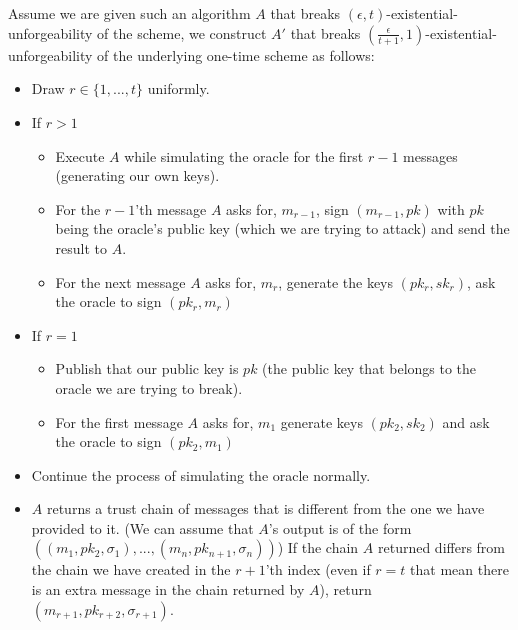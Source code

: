 \documentclass{article}
\begin{document}
\section{}%
Assume we are given such an algorithm $A$ that breaks $(\epsilon,t)$-existential-unforgeability of the scheme, we construct $A'$ that breaks $(\frac{\epsilon}{t+1}, 1)$-existential- unforgeability of the underlying one-time scheme as follows:\\
\begin{itemize}
\item Draw $r\in\{1,...,t\}$ uniformly.
\item If $r>1$
\begin{itemize}
\item Execute $A$ while simulating the oracle for the first $r-1$ messages (generating our own keys).
\item For the $r-1$'th message $A$ asks for, $m_{r-1}$, sign $(m_{r-1}, pk)$ with $pk$ being the oracle's public key (which we are trying to attack) and send the result to $A$.
\item For the next message $A$ asks for, $m_r$, generate the keys $(pk_r, sk_r)$, ask the oracle to sign $(pk_r, m_r)$
\end{itemize}
\item If $r=1$
\begin{itemize}
\item Publish that our public key is $pk$ (the public key that belongs to the oracle we are trying to break).
\item For the first message $A$ asks for, $m_1$ generate keys $(pk_2, sk_2)$ and ask the oracle to sign $(pk_2, m_1 )$
\end{itemize}

\item Continue the process of simulating the oracle normally.
\item $A$ returns a trust chain of messages that is different from the one we have provided to it. (We can assume that $A$'s output is of the form $((m_1, pk_2, \sigma_1),..., (m_n, pk_{n+1}, \sigma_n))$)
If the chain $A$ returned differs from the chain we have created in the $r+1$'th index (even if $r=t$ that mean there is an extra message in the chain returned by $A$), return $(m_{r+1}, pk_{r+2}, \sigma_{r+1})$.

\end{itemize}
\end{document}
